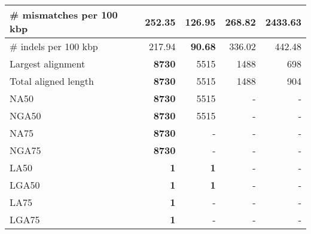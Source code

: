 \documentclass[12pt,a4paper]{article}
\begin{document}
\begin{table}[ht]
\begin{center}
\begin{tabular}{|l*{4}{|r}|}
\# mismatches per 100 kbp & 252.35 & {\bf 126.95} & 268.82 & 2433.63 \\ \hline
\# indels per 100 kbp & 217.94 & {\bf 90.68} & 336.02 & 442.48 \\ \hline
Largest alignment & {\bf 8730} & 5515 & 1488 & 698 \\ \hline
Total aligned length & {\bf 8730} & 5515 & 1488 & 904 \\ \hline
NA50 & {\bf 8730} & 5515 & - & - \\ \hline
NGA50 & {\bf 8730} & 5515 & - & - \\ \hline
NA75 & {\bf 8730} & - & - & - \\ \hline
NGA75 & {\bf 8730} & - & - & - \\ \hline
LA50 & {\bf 1} & {\bf 1} & - & - \\ \hline
LGA50 & {\bf 1} & {\bf 1} & - & - \\ \hline
LA75 & {\bf 1} & - & - & - \\ \hline
LGA75 & {\bf 1} & - & - & - \\ \hline
\end{tabular}
\end{center}
\end{table}
\end{document}
